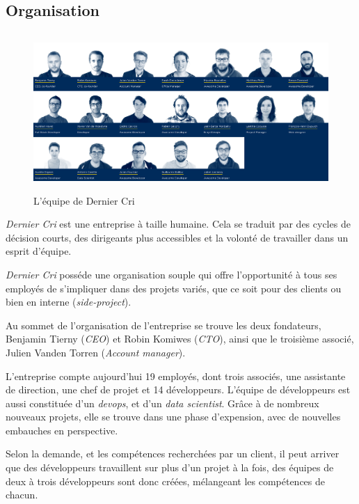 \bigskip

\subsection{Organisation}\label{organisation}

\begin{figure}[h]
  \centering
  \includegraphics[height=6cm]{figures/team.png}
  \caption{L'équipe de Dernier Cri}
\end{figure}

\bigskip

\emph{Dernier Cri} est une entreprise à taille humaine. Cela se traduit
par des cycles de décision courts, des dirigeants plus accessibles et la
volonté de travailler dans un esprit d'équipe.

\bigskip

\emph{Dernier Cri} posséde une organisation souple qui offre
l'opportunité à tous ses employés de s'impliquer dans des projets
variés, que ce soit pour des clients ou bien en interne
(\emph{side-project}).

\bigskip

Au sommet de l'organisation de l'entreprise se trouve les deux
fondateurs, Benjamin Tierny (\emph{CEO}) et Robin Komiwes (\emph{CTO}),
ainsi que le troisième associé, Julien Vanden Torren (\emph{Account
manager}).

\bigskip

L'entreprise compte aujourd'hui 19 employés, dont trois associés, une
assistante de direction, une chef de projet et 14 développeurs. L'équipe
de développeurs est aussi constituée d'un \emph{devops}, et d'un
\emph{data scientist}. Grâce à de nombreux nouveaux projets, elle se
trouve dans une phase d'expension, avec de nouvelles embauches en
perspective.

\bigskip

Selon la demande, et les compétences recherchées par un client, il peut
arriver que des développeurs travaillent sur plus d'un projet à la fois,
des équipes de deux à trois développeurs sont donc créées, mélangeant
les compétences de chacun.

